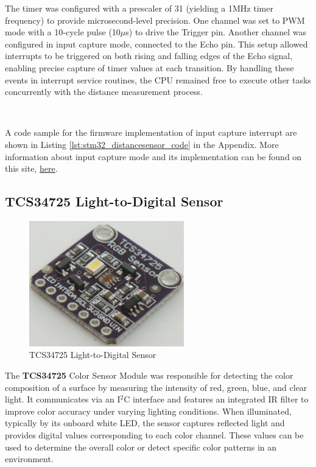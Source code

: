 \documentclass{article}
\begin{document}
The timer was configured with a prescaler of 31 (yielding a 1MHz timer frequency) to provide microsecond-level precision. One channel was set to PWM mode with a 10-cycle pulse (10$\mu$s) to drive the Trigger pin. Another channel was configured in input capture mode, connected to the Echo pin. This setup allowed interrupts to be triggered on both rising and falling edges of the Echo signal, enabling precise capture of timer values at each transition. By handling these events in interrupt service routines, the CPU remained free to execute other tasks concurrently with the distance measurement process.

\

A code sample for the firmware implementation of input capture interrupt are shown in Listing \ref{lst:stm32_distancesensor_code} in the Appendix. More information about input capture mode and its implementation can be found on this site, \href{https://community.st.com/t5/stm32-mcus/how-to-use-the-input-capture-feature/ta-p/704161}{here}.

\subsection{TCS34725 Light-to-Digital Sensor}
\label{sec:colorsensor}
\begin{figure}[H]
    \centering
    \includegraphics[width=0.6\textwidth]{Figures/colorsensor.jpg} %
    \caption{TCS34725 Light-to-Digital Sensor}
    \label{fig:colorsensor}


\end{figure}

The \textbf{TCS34725} Color Sensor Module was responsible for detecting the color composition of a surface by measuring the intensity of red, green, blue, and clear light. It communicates via an I$^2$C interface and features an integrated IR filter to improve color accuracy under varying lighting conditions. When illuminated, typically by its onboard white LED, the sensor captures reflected light and provides digital values corresponding to each color channel. These values can be used to determine the overall color or detect specific color patterns in an environment.
\end{document}
